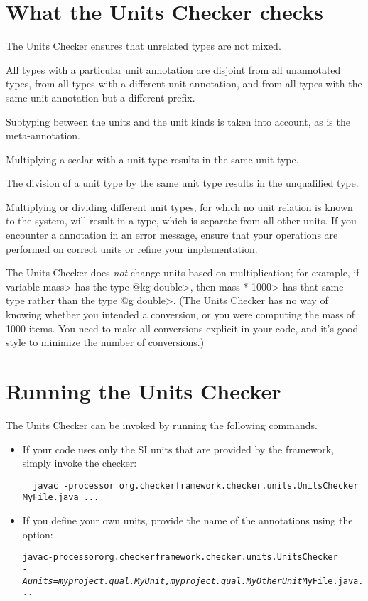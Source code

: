 \section{What the Units Checker checks\label{units-checks}}

The Units Checker ensures that unrelated types are not mixed. 

All types with a particular unit annotation are
disjoint from all unannotated types, from all types with a different unit
annotation, and from all types with the same unit annotation but a
different prefix.

Subtyping between the units and the unit kinds is taken into account,
as is the  meta-annotation.

Multiplying a scalar with a unit type results in the same unit type.

The division of a unit type by the same unit type
results in the unqualified type.

Multiplying or dividing different unit types, for which no unit
relation is known to the system, will result in a 
type, which is separate from all other units.
If you encounter a  annotation in an error message,
ensure that your operations are performed on correct units or refine
your  implementation.

The Units Checker does \emph{not} change units based on multiplication; for
example, if variable \<mass> has the type \<@kg double>, then \<mass *
1000> has that same type rather than the type \<@g double>.  (The Units
Checker has no way of knowing whether you intended a conversion, or you
were computing the mass of 1000 items.  You need to make all conversions
explicit in your code, and it's good style to minimize the number of
conversions.)


\section{Running the Units Checker\label{units-running}}

The Units Checker can be invoked by running the following commands.

\begin{itemize}
\item
If your code uses only the SI units that are provided by the
framework, simply invoke the checker:

\begin{Verbatim}
  javac -processor org.checkerframework.checker.units.UnitsChecker MyFile.java ...
\end{Verbatim}

\item 
If you define your own units, provide the name of the annotations using the
 option:

\begin{alltt}
  javac -processor org.checkerframework.checker.units.UnitsChecker \ttbs
        \textit{-Aunits=myproject.qual.MyUnit,myproject.qual.MyOtherUnit} MyFile.java ...
\end{alltt}
\end{itemize}



